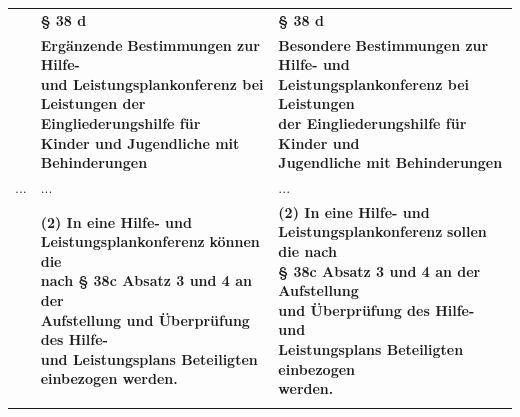 \documentclass[10pt,a4paper,landscape]{article}
\begin{document}
\begin{longtable}{|L{8.2cm}|L{8.2cm}|L{8.2cm}|}
\hhline{|---|}
 & \textbf{\S{} 38 d } & \textbf{\S{} 38 d } \\
\hhline{|---|}
 & \textbf{\textcolor{diffred}{Ergänzende}}\textbf{ Bestimmungen zur Hilfe-  \newline und Leistungsplankonferenz bei  \newline Leistungen der Eingliederungshilfe für  \newline Kinder und Jugendliche mit  \newline Behinderungen } & \textbf{\textcolor{diffgreen}{Besondere}}\textbf{ Bestimmungen zur Hilfe- und  \newline Leistungsplankonferenz bei Leistungen  \newline der Eingliederungshilfe für Kinder und  \newline Jugendliche mit Behinderungen } \\
\hhline{|---|}
... & ... & ... \\
\hhline{|---|}
 & \textbf{(2) In eine Hilfe- und  \newline Leistungsplankonferenz }\textbf{\textcolor{diffred}{können}}\textbf{ die  \newline nach \S{} 38c Absatz 3 und 4 an der  \newline Aufstellung und Überprüfung des Hilfe-  \newline und Leistungsplans Beteiligten  \newline einbezogen werden. } & \textbf{(2) In eine Hilfe- und  \newline Leistungsplankonferenz }\textbf{\textcolor{diffgreen}{sollen}}\textbf{ die nach  \newline \S{} 38c Absatz 3 und 4 an der Aufstellung  \newline und Überprüfung des Hilfe- und  \newline Leistungsplans Beteiligten einbezogen  \newline werden. } \\
\hhline{|---|}

\end{longtable}
\end{document}
